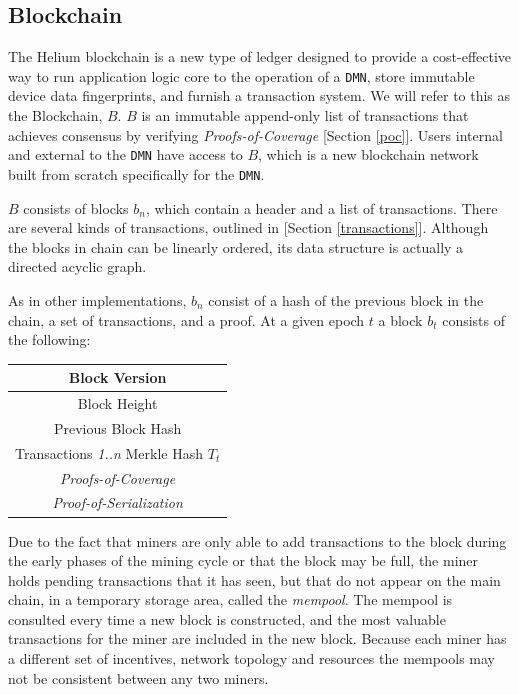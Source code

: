 \documentclass[10pt, nonatbib, nocopyrightspace, reprint]{sigplanconf}
\begin{document}
\subsection{Blockchain} \label{blockchain}

The Helium blockchain is a new type of ledger designed to provide a cost-effective way to run application logic core to the operation of a \verb|DMN|, store immutable device data fingerprints, and furnish a transaction system. We will refer to this as the Blockchain, $B$. $B$ is an immutable append-only list of transactions that achieves consensus by verifying \emph{Proofs-of-Coverage} [Section \ref{poc}]. Users internal and external to the \verb|DMN| have access to $B$, which is a new blockchain network built from scratch specifically for the \verb|DMN|.

$B$ consists of blocks $b_n$, which contain a header and a list of transactions. There are several kinds of transactions, outlined in [Section \ref{transactions}]. Although the blocks in chain can be linearly ordered, its data structure is actually a directed acyclic graph.

As in other implementations, $b_n$ consist of a hash of the previous block in the chain, a set of transactions, and a proof. At a given epoch $t$ a block $b_t$ consists of the following:

\begin{center}
    \begin{tabular}{|c|}
    	 \hline
         Block Version \\
         \hline
         Block Height \\
         \hline
         Previous Block Hash \\
         \hline
         Transactions \emph{1..n} Merkle Hash $T_t$ \\
         \hline
         \emph{Proofs-of-Coverage} \\
         \hline
         \emph{Proof-of-Serialization} \\
         \hline
    \end{tabular}
\end{center}

Due to the fact that miners are only able to add transactions to the block during the early phases of the mining cycle or that the block may be full, the miner holds pending transactions that it has seen, but that do not appear on the main chain, in a temporary storage area, called the \emph{mempool}. The mempool is consulted every time a new block is constructed, and the most valuable transactions for the miner are included in the new block. Because each miner has a different set of incentives, network topology and resources the mempools may not be consistent between any two miners.
\end{document}

